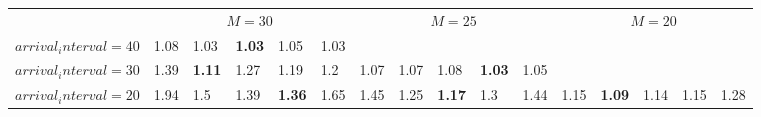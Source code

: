 \begin{tabular}{l  | l l l l l  | l l l l l  | l l l l l }
& \multicolumn{5}{c}{$M=30$} & \multicolumn{5}{c}{$M=25$} & \multicolumn{5}{c}{$M=20$} \\
$arrival_interval=40$ & 1.08 & 1.03 & \textbf{1.03} & 1.05 & 1.03 &  &  &  &  &  &  &  &  &  &  \\
$arrival_interval=30$ & 1.39 & \textbf{1.11} & 1.27 & 1.19 & 1.2 & 1.07 & 1.07 & 1.08 & \textbf{1.03} & 1.05 &  &  &  &  &  \\
$arrival_interval=20$ & 1.94 & 1.5 & 1.39 & \textbf{1.36} & 1.65 & 1.45 & 1.25 & \textbf{1.17} & 1.3 & 1.44 & 1.15 & \textbf{1.09} & 1.14 & 1.15 & 1.28
\end{tabular}